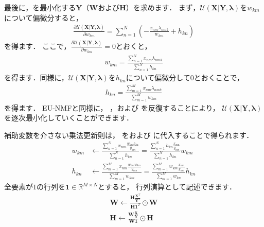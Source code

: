 最後に，を最小化する$\bm{Y}$（$\bm{W}$および$\bm{H}$）を求めます．
まず，$\mathcal{U}(\bm{X}|\bm{Y},\bm\lambda)$を$w_{km}$について偏微分すると，
\begin{align}
\frac{\partial \mathcal{U}(\bm{X}|\bm{Y},\bm\lambda)}{\partial w_{km}} 
= \sum_{n=1}^N \left(- \frac{x_{nm} \lambda_{nmk}}{w_{km}} + h_{kn} \right)
\end{align}
を得ます．
ここで，$\frac{\partial \mathcal{U}(\bm{X}|\bm{Y},\bm\lambda)}{\partial w_{km}}=0$とおくと，
\begin{align}
w_{km} 
= \frac{\sum_{n=1}^N x_{nm} \lambda_{nmk}}{\sum_{n=1}^N h_{kn}}
\label{eqn:kl_nmf_mu_w}
\end{align}
を得ます．同様に，$\mathcal{U}(\bm{X}|\bm{Y},\bm\lambda)$を$h_{kn}$について偏微分して$0$とおくことで，
\begin{align}
h_{kn} 
= \frac{\sum_{m=1}^M x_{nm} \lambda_{nmk}}{\sum_{m=1}^M w_{km}}
\label{eqn:kl_nmf_mu_h}
\end{align}
を得ます．
EU-NMFと同様に，
，および
を反復することにより，
$\mathcal{U}(\bm{X}|\bm{Y},\bm\lambda)$を逐次最小化していくことができます．

補助変数を介さない乗法更新則は，
をおよび
に代入することで得られます．
\begin{align}
w_{km} 
&\gets \frac{\sum_{n=1}^N x_{nm} \frac{w_{km} h_{kn}}{y_{nm}}}{\sum_{n=1}^N h_{kn}}
= \frac{\sum_{n=1}^N h_{kn} \frac{x_{nm}}{y_{nm}}}{\sum_{n=1}^N h_{kn}} w_{km}
\label{eqn:kl_nmf_mu_w2}
\\
h_{kn} 
&\gets \frac{\sum_{m=1}^M x_{nm} \frac{w_{km} w_{km}}{y_{nm}}}{\sum_{m=1}^M w_{km}}
= \frac{\sum_{m=1}^M w_{km} \frac{x_{nm}}{y_{nm}}}{\sum_{m=1}^M w_{kn}} h_{kn}
\label{eqn:kl_nmf_mu_h2}
\end{align}
全要素が$1$の行列を$\bm{1} \in \mathbb{R}^{M \times N}$とすると，
行列演算として記述できます．
\begin{align}
\bm{W} \gets \frac{\bm{H} \frac{\bm{X}^T}{\bm{Y}^T}}{\bm{H}\bm{1}^T} \odot \bm{W}
\label{eqn:kl_nmf_mu_W}
\\
\bm{H} \gets \frac{\bm{W} \frac{\bm{X}}{\bm{Y}}}{\bm{W}\bm{1}} \odot \bm{H}
\label{eqn:kl_nmf_mu_H}
\end{align}

